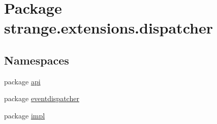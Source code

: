 \hypertarget{namespacestrange_1_1extensions_1_1dispatcher}{\section{Package strange.\-extensions.\-dispatcher}
\label{namespacestrange_1_1extensions_1_1dispatcher}
}
\subsection*{Namespaces}
\begin{DoxyCompactItemize}
\item 
package \hyperlink{namespacestrange_1_1extensions_1_1dispatcher_1_1api}{api}
\item 
package \hyperlink{namespacestrange_1_1extensions_1_1dispatcher_1_1eventdispatcher}{eventdispatcher}
\item 
package \hyperlink{namespacestrange_1_1extensions_1_1dispatcher_1_1impl}{impl}
\end{DoxyCompactItemize}
